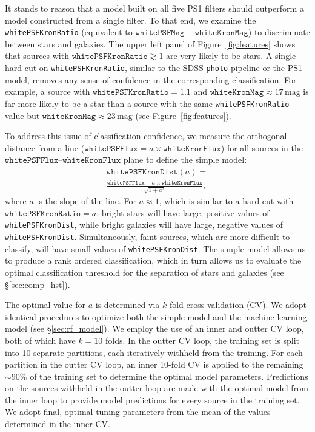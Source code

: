 \documentclass[twocolumn, dvipdfmx]{aastex62}
\begin{document}
It stands to reason that a model built on all five PS1 filters should outperform a model constructed from a single filter. To that end, we examine the \texttt{whitePSFKronRatio} (equivalent to $\mathtt{whitePSFMag} - \mathtt{whiteKronMag}$) to discriminate between stars and galaxies. The upper left panel of Figure~\ref{fig:features} shows that sources with $\mathtt{whitePSFKronRatio} \gtrsim 1$ are very likely to be stars. A single hard cut on \texttt{whitePSFKronRatio}, similar to the SDSS \texttt{photo} pipeline or the PS1 model, removes any sense of confidence in the corresponding classification. For example, a source with $\mathtt{whitePSFKronRatio} = 1.1$ and $\mathtt{whiteKronMag} \approx 17\,\mathrm{mag}$ is far more likely to be a star than a source with the same \texttt{whitePSFKronRatio} value but $\mathtt{whiteKronMag} \approx 23\,\mathrm{mag}$ (see Figure~\ref{fig:features}).

To address this issue of classification confidence, we measure the
orthogonal distance from a line ($\mathtt{whitePSFFlux} = a\times
\mathtt{whiteKronFlux}$) for all sources in the
$\mathtt{whitePSFFlux}$--$\mathtt{whiteKronFlux}$ plane to define the simple model:
%
\begin{multline}
 \mathtt{whitePSFKronDist}(a) = \\
 \frac{\mathtt{whitePSFFlux} - a\times\mathtt{whiteKronFlux}}{ \sqrt{1 + a^2}},
 \label{eqn:psfkrondist}
\end{multline}
%
where $a$ is the slope of the line. For $a \approx 1$, which is similar to a
hard cut with $\mathtt{whitePSFKronRatio} = a$, bright stars will have
large, positive values of \texttt{whitePSFKronDist}, while bright galaxies
will have large, negative values of \texttt{whitePSFKronDist}.
Simultaneously, faint sources, which are more difficult to classify, will
have small values of \texttt{whitePSFKronDist}. The simple model allows us
to produce a rank ordered classification, which in turn allows us to
evaluate the optimal classification threshold for the separation of stars
and galaxies (see \S\ref{sec:comp_hst}).

The optimal value for $a$ is determined via $k$-fold cross validation (CV).
We adopt identical procedures to optimize both the simple model and the
machine learning model (see \S\ref{sec:rf_model}). We employ the use of an
inner and outter CV loop, both of which have $k = 10$ folds. In the outter
CV loop, the training set is split into 10 separate partitions, each
iteratively withheld from the training. For each partition in the outter CV
loop, an inner 10-fold CV is applied to the remaining $\sim$90\% of the
training set to determine the optimal model parameters. Predictions on the
sources withheld in the outter loop are made with the optimal model from the
inner loop to provide model predictions for every source in the training
set. We adopt final, optimal tuning parameters from the mean of the values
determined in the inner CV.
\end{document}
